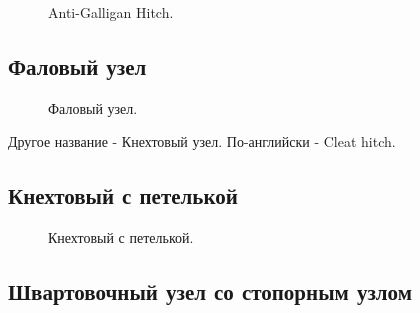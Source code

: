 \begin{figure}[H]\centering
	\begin{minipage}{1\linewidth}
		\begin{center}
			\tcbox[enhanced jigsaw,colframe=black,opacityframe=0.5,opacityback=0.5]
			{\centering{}}
		\end{center}
	\end{minipage}
\caption{Anti-Galligan Hitch.}
\label{ris:Anti-Galligan_Hitch}
\end{figure}

\subsection{Фаловый узел}

\begin{figure}[H]\centering
	\begin{minipage}{1\linewidth}
		\begin{center}
			\tcbox[enhanced jigsaw,colframe=black,opacityframe=0.5,opacityback=0.5]
			{\centering{}}
		\end{center}
	\end{minipage}
\caption{Фаловый узел.}
\label{ris:Cleat_hitch}
\end{figure}

Другое название - Кнехтовый узел. По-английски - Cleat hitch.

\subsection{Кнехтовый с петелькой}

\begin{figure}[H]\centering
	\begin{minipage}{1\linewidth}
		\begin{center}
			\tcbox[enhanced jigsaw,colframe=black,opacityframe=0.5,opacityback=0.5]
			{\centering{}}
		\end{center}
	\end{minipage}
\caption{Кнехтовый с петелькой.}
\label{ris:Cleat_hitch_with_bight}
\end{figure}

\subsection{Швартовочный узел со стопорным узлом}

